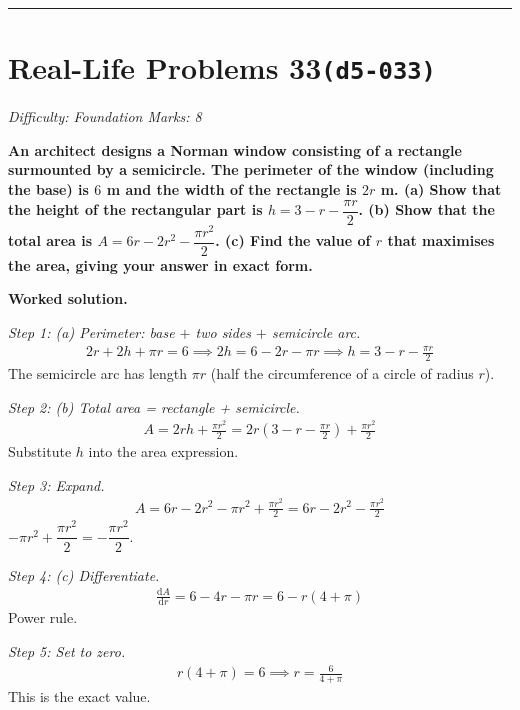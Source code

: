 \documentclass[11pt]{article}
\newcommand{\question}[1]{\par\medskip\noindent\textbf{#1}\par}
\begin{document}
\medskip\hrule

\section*{Real-Life Problems 33\quad\small\texttt{(d5-033)}}
\textit{Difficulty: Foundation \quad\textbar\quad Marks: 8}

\question{An architect designs a Norman window consisting of a rectangle surmounted by a semicircle. The perimeter of the window (including the base) is \( 6 \) m and the width of the rectangle is \( 2r \) m. (a) Show that the height of the rectangular part is \( h = 3 - r - \dfrac{\pi r}{2} \). (b) Show that the total area is \( A = 6r - 2r^2 - \dfrac{\pi r^2}{2} \). (c) Find the value of \( r \) that maximises the area, giving your answer in exact form.}

\textbf{Worked solution.}

\textit{Step 1: (a) Perimeter: base \( + \) two sides \( + \) semicircle arc.}
\[\begin{gathered}
2r + 2h + \pi r = 6 \implies 2h = 6 - 2r - \pi r \implies h = 3 - r - \frac{\pi r}{2}
\end{gathered}\]
The semicircle arc has length \( \pi r \) (half the circumference of a circle of radius \( r \)).

\textit{Step 2: (b) Total area = rectangle + semicircle.}
\[\begin{gathered}
A = 2rh + \frac{\pi r^2}{2} = 2r\!\left(3 - r - \frac{\pi r}{2}\right) + \frac{\pi r^2}{2}
\end{gathered}\]
Substitute \( h \) into the area expression.

\textit{Step 3: Expand.}
\[\begin{gathered}
A = 6r - 2r^2 - \pi r^2 + \frac{\pi r^2}{2} = 6r - 2r^2 - \frac{\pi r^2}{2}
\end{gathered}\]
\( -\pi r^2 + \dfrac{\pi r^2}{2} = -\dfrac{\pi r^2}{2} \).

\textit{Step 4: (c) Differentiate.}
\[\begin{gathered}
\frac{\mathrm{d}A}{\mathrm{d}r} = 6 - 4r - \pi r = 6 - r(4 + \pi)
\end{gathered}\]
Power rule.

\textit{Step 5: Set to zero.}
\[\begin{gathered}
r(4 + \pi) = 6 \implies r = \frac{6}{4 + \pi}
\end{gathered}\]
This is the exact value.
\end{document}

